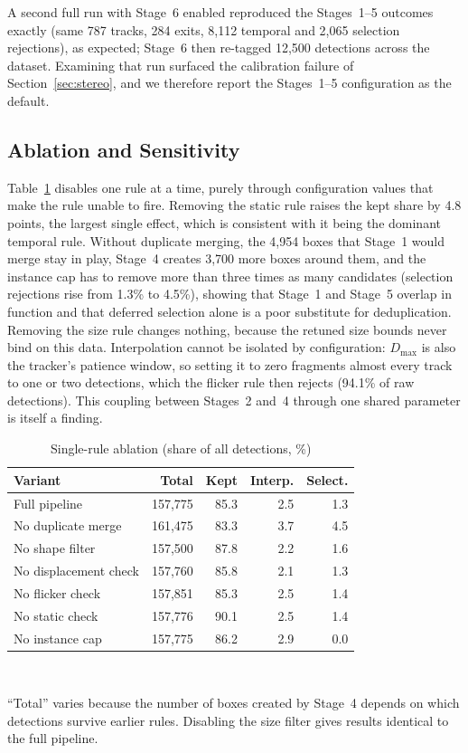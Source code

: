 \documentclass[journal]{IEEEtran}
\begin{document}
A second full run with Stage~6 enabled reproduced the Stages~1--5 outcomes exactly (same 787 tracks, 284 exits, 8,112 temporal and 2,065 selection rejections), as expected; Stage~6 then re-tagged 12,500 detections across the dataset. Examining that run surfaced the calibration failure of Section~\ref{sec:stereo}, and we therefore report the Stages~1--5 configuration as the default.

\subsection{Ablation and Sensitivity}
Table~\ref{tab:ablation} disables one rule at a time, purely through configuration values that make the rule unable to fire. Removing the static rule raises the kept share by 4.8 points, the largest single effect, which is consistent with it being the dominant temporal rule. Without duplicate merging, the 4,954 boxes that Stage~1 would merge stay in play, Stage~4 creates 3,700 more boxes around them, and the instance cap has to remove more than three times as many candidates (selection rejections rise from 1.3\% to 4.5\%), showing that Stage~1 and Stage~5 overlap in function and that deferred selection alone is a poor substitute for deduplication. Removing the size rule changes nothing, because the retuned size bounds never bind on this data. Interpolation cannot be isolated by configuration: $D_{\max}$ is also the tracker's patience window, so setting it to zero fragments almost every track to one or two detections, which the flicker rule then rejects (94.1\% of raw detections). This coupling between Stages~2 and~4 through one shared parameter is itself a finding.

\begin{table}[t]
\centering
\caption{Single-rule ablation (share of all detections, \%)}
\label{tab:ablation}
\footnotesize
\begin{tabular}{@{}lrrrr@{}}
\toprule
Variant & Total & Kept & Interp. & Select. \\
\midrule
Full pipeline & 157,775 & 85.3 & 2.5 & 1.3 \\
No duplicate merge & 161,475 & 83.3 & 3.7 & 4.5 \\
No shape filter & 157,500 & 87.8 & 2.2 & 1.6 \\
No displacement check & 157,760 & 85.8 & 2.1 & 1.3 \\
No flicker check & 157,851 & 85.3 & 2.5 & 1.4 \\
No static check & 157,776 & 90.1 & 2.5 & 1.4 \\
No instance cap & 157,775 & 86.2 & 2.9 & 0.0 \\
\bottomrule
\end{tabular}\\[2pt]
\parbox{\columnwidth}{\footnotesize ``Total'' varies because the number of boxes created by Stage~4 depends on which detections survive earlier rules. Disabling the size filter gives results identical to the full pipeline.}
\end{table}
\end{document}

